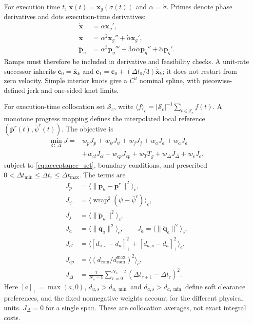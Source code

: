 \documentclass[journal,twoside]{IEEEtran}
\newcommand{\wrap}{\operatorname{wrap}}
\newcommand{\pos}[1]{\left[#1\right]_+}
\begin{document}
For execution time $t$, $\mathbf x(t)=\mathbf x_g(\sigma(t))$ and $\alpha=\dot\sigma$. Primes denote phase derivatives and dots execution-time derivatives:
\begin{equation}
\begin{aligned}
\dot{\mathbf x}&=\alpha\mathbf x_g',\\
\ddot{\mathbf x}&=\alpha^2\mathbf x_g''+\dot\alpha\mathbf x_g',\\
\dddot{\mathbf p}_u&=\alpha^3\mathbf p_g'''
+3\alpha\dot\alpha\mathbf p_g''+\ddot\alpha\mathbf p_g'.
\end{aligned}
\label{eq:chain_rule}
\end{equation}
Ramps must therefore be included in derivative and feasibility checks. A unit-rate successor inherits $\mathbf c_0=\bar{\mathbf x}_k$ and $\mathbf c_1=\mathbf c_0+(\Delta t_0/3)\dot{\bar{\mathbf x}}_k$; it does not restart from zero velocity. Simple interior knots give a $C^2$ nominal spline, with piecewise-defined jerk and one-sided knot limits.

For execution-time collocation set $\mathcal S_c$, write $\langle f\rangle_c=|\mathcal S_c|^{-1}\sum_{t\in\mathcal S_c}f(t)$. A monotone progress mapping defines the interpolated local reference $(\bar{\mathbf p}^{r}(t),\bar\psi^r(t))$. The objective is
\begin{equation}
\begin{aligned}
\min_{\mathbf C,\Delta}J={}&w_pJ_p+w_\psi J_\psi+w_jJ_j
+w_{\dot a}J_{\dot a}+w_{\ddot a}J_{\ddot a}\\
&+w_{cl}J_{cl}+w_{cp}J_{cp}+w_TT_g+w_\Delta J_\Delta+w_eJ_e,
\end{aligned}
\label{eq:objective}
\end{equation}
subject to \eqref{eq:acceptance_set}, boundary conditions, and prescribed $0<\Delta t_{\min}\le\Delta t_r\le\Delta t_{\max}$. The terms are
\begin{equation}
\begin{aligned}
J_p&=\langle\|\mathbf p_u-\bar{\mathbf p}^{r}\|^2\rangle_c,\\
J_\psi&=\langle\wrap^2(\psi-\bar\psi^r)\rangle_c,\\
J_j&=\langle\|\dddot{\mathbf p}_u\|^2\rangle_c,\\
J_{\dot a}&=\langle\|\dot{\mathbf q}_a\|^2\rangle_c,\qquad
J_{\ddot a}=\langle\|\ddot{\mathbf q}_a\|^2\rangle_c,\\
J_{cl}&=\langle\pos{d_{u,s}-d_u}^2+\pos{d_{a,s}-d_a}^2\rangle_c,\\
J_{cp}&=\langle(d_{\mathrm{com}}/d_{\mathrm{com}}^{\max})^2\rangle_c,\\
J_\Delta&=\frac{1}{N_s-1}\sum_{r=0}^{N_s-2}(\Delta t_{r+1}-\Delta t_r)^2.
\end{aligned}
\label{eq:cost_terms}
\end{equation}
Here $[a]_+=\max(a,0)$, $d_{u,s}>d_{u,\min}$ and $d_{a,s}>d_{a,\min}$ define soft clearance preferences, and the fixed nonnegative weights account for the different physical units. $J_\Delta=0$ for a single span. These are collocation averages, not exact integral costs.
\end{document}
